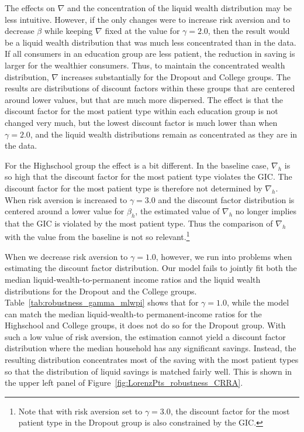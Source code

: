 \documentclass[\econtexRoot/HAFiscal]{subfiles}
\begin{document}
The effects on $\nabla$ and the concentration of the liquid wealth distribution may be less intuitive. However, if the only changes were to increase risk aversion and to decrease $\beta$ while keeping $\nabla$ fixed at the value for $\gamma=2.0$, then the result would be a liquid wealth distribution that was much less concentrated than in the data. If all consumers in an education group are less patient, the reduction in saving is larger for the wealthier consumers. Thus, to maintain the concentrated wealth distribution, $\nabla$ increases substantially for the Dropout and College groups. The results are distributions of discount factors within these groups that are centered around lower values, but that are much more dispersed. The effect is that the discount factor for the most patient type within each education group is not changed very much, but the lowest discount factor is much lower than when $\gamma=2.0$, and the liquid wealth distributions remain as concentrated as they are in the data.

For the Highschool group the effect is a bit different. In the baseline case, $\nabla_h$ is so high that the discount factor for the most patient type violates the GIC. The discount factor for the most patient type is therefore not determined by $\nabla_h$. When risk aversion is increased to $\gamma=3.0$ and the discount factor distribution is centered around a lower value for $\beta_h$, the estimated value of $\nabla_h$ no longer implies that the GIC is violated by the most patient type. Thus the comparison of $\nabla_h$ with the value from the baseline is not so relevant.\footnote{Note that with risk aversion set to $\gamma=3.0$, the discount factor for the most patient type in the Dropout group is also constrained by the GIC.}

When we decrease risk aversion to $\gamma=1.0$, however, we run into problems when estimating the discount factor distribution. Our model fails to jointly fit both the median liquid-wealth-to-permanent income ratios and the liquid wealth distributions for the Dropout and the College groups. Table~\ref{tab:robustness_gamma_mlwpi} shows that for $\gamma=1.0$, while the model can match the median liquid-wealth-to permanent-income ratios for the Highschool and College groups, it does not do so for the Dropout group. With such a low value of risk aversion, the estimation cannot yield a discount factor distribution where the median household has any significant savings. Instead, the resulting distribution concentrates most of the saving with the most patient types so that the distribution of liquid savings is matched fairly well. This is shown in the upper left panel of Figure~\ref{fig:LorenzPts_robustness_CRRA}. 
\end{document}
